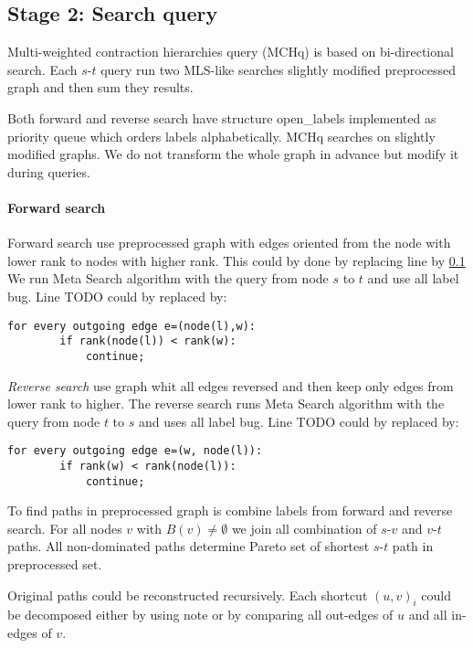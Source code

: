 
\subsection{Stage 2: Search query}

Multi-weighted contraction hierarchies query (MCHq) 
is based on bi-directional search.
Each $s$-$t$ query run two MLS-like searches slightly modified preprocessed graph
and then sum they results.

Both forward and reverse search have
structure open\_labels implemented as priority queue which orders labels
alphabetically.
MCHq searches on slightly modified graphs. 
We do not transform the whole graph in advance but modify it during queries.

\paragraph*{Forward search}
Forward search use preprocessed graph with edges oriented from the node with lower rank to nodes with higher rank.
This could by done by replacing line  by \ref{}
We run Meta Search algorithm with the query from node $s$ to $t$ and use all label bug.
Line TODO could by replaced by:

\begin{lstlisting}[caption={MCHp},label=list:8-6,captionpos=t,float,abovecaptionskip=-\medskipamount]
    for every outgoing edge e=(node(l),w):
    	if rank(node(l)) < rank(w):
        	continue;
\end{lstlisting}

\emph{Reverse search} use graph whit all edges reversed and then keep only edges
from lower rank to higher. 
The reverse search runs Meta Search algorithm with the query from node $t$ to $s$ and uses all label bug.
Line TODO could by replaced by:

\begin{lstlisting}[caption={MCHp},label=list:8-6,captionpos=t,float,abovecaptionskip=-\medskipamount]
    for every outgoing edge e=(w, node(l)):
    	if rank(w) < rank(node(l)):
        	continue;
\end{lstlisting}

To find paths in preprocessed graph is combine labels from forward and reverse search. 
For all nodes $v$ with $B(v) \ne \emptyset$ we join all combination of $s$-$v$ and $v$-$t$ paths. 
All non-dominated paths determine Pareto set of shortest $s$-$t$ path in preprocessed set.

Original paths could be reconstructed recursively.
Each shortcut $(u,v)_i$ could be decomposed either by using note or 
by comparing all out-edges of $u$ and all in-edges of $v$.


